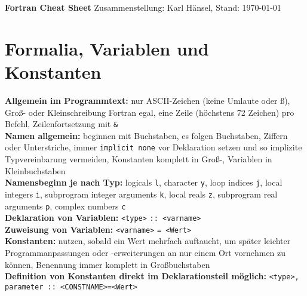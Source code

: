 \documentclass[a4paper, twocolumn]{scrarticle}
\begin{document}
{\Huge \textbf{\textsf{Fortran Cheat Sheet}}}
Zusammenstellung: Karl Hänsel, Stand: \today

\section{Formalia, Variablen und Konstanten}
\textbf{Allgemein im Programmtext:} nur ASCII-Zeichen (keine Umlaute oder ß), Groß- oder Kleinschreibung Fortran egal, eine Zeile (höchstens 72 Zeichen) pro Befehl, Zeilenfortsetzung mit \lstinline|&|\\
\textbf{Namen allgemein:} beginnen mit Buchstaben, es folgen Buchstaben, Ziffern oder Unterstriche, immer \lstinline|implicit none| vor Deklaration setzen und so implizite Typvereinbarung vermeiden, Konstanten komplett in Groß-, Variablen in Kleinbuchstaben\\
\textbf{Namensbeginn je nach Typ:} logicals \lstinline|l|, character \lstinline|y|, loop indices \lstinline|j|, local integers \lstinline|i|, subprogram integer arguments \lstinline|k|, local reals \lstinline|z|, subprogram real arguments \lstinline|p|, complex numbers \lstinline|c|\\
\textbf{Deklaration von Variablen:} \lstinline|<type>| \lstinline|:: <varname>|\\
\textbf{Zuweisung von Variablen:} \lstinline|<varname>| \lstinline|= <Wert>|\\
\textbf{Konstanten:} nutzen, sobald ein Wert mehrfach auftaucht, um später leichter Programmanpassungen oder -erweiterungen an nur einem Ort vornehmen zu können, Benennung immer komplett in Großbuchstaben\\
\textbf{Definition von Konstanten direkt im Deklarationsteil möglich:} \lstinline|<type>, parameter :: <CONSTNAME>=<Wert>|
\end{document}
